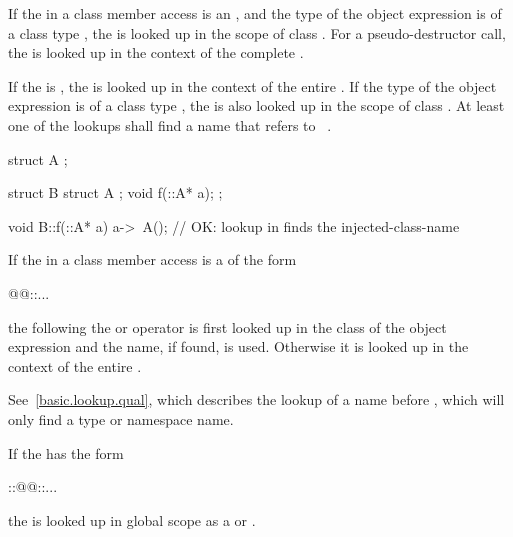 \pnum
If the  in a class member
access is an , and the type of
the object expression is of a class type , the
 is looked up in the scope of class .
For a pseudo-destructor call,
the  is looked up in the context of the complete
.

\pnum
If the  is \tcode{\~}, the
 is looked up in the context of the entire
. If the type  of the object
expression is of a class type , the  is
also looked up in the scope of class . At least one of the
lookups shall find a name that refers to \cv{}~. \begin{example}

\begin{codeblock}
struct A { };

struct B {
  struct A { };
  void f(::A* a);
};

void B::f(::A* a) {
  a->~A();                      // OK: lookup in  finds the injected-class-name
}
\end{codeblock}\end{example}

\pnum
If the  in a class member access is a
 of the form
\begin{codeblock}
@@::...
\end{codeblock}
the  following the  or
\tcode{->} operator is
first looked up in the class of the object expression and the name, if found,
is used. Otherwise it is looked up in the context of the entire
. \begin{note} See~\ref{basic.lookup.qual}, which
describes the lookup of a name before \tcode{::}, which will only find a type
or namespace name. \end{note}

\pnum
If the  has the form
\begin{codeblock}
::@@::...
\end{codeblock}
the  is looked up in global scope
as a  or .

